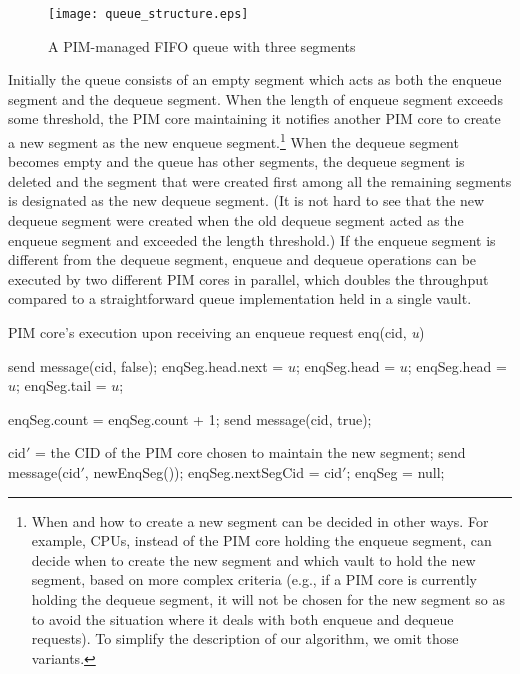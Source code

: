 \begin{figure}[ht!]
\centering
\texttt{[image: queue\_structure.eps]}
\caption{A PIM-managed FIFO queue with three segments}
\label{figure:queue_structure}
\end{figure}

Initially the queue consists of an empty segment which acts as both the enqueue segment and 
the dequeue segment. 
When the length of enqueue segment exceeds some threshold, the PIM core maintaining it
notifies another PIM core to create a new segment as the new enqueue segment.\footnote{
When and how to create a new segment can be decided in other ways.
For example, CPUs, instead of the PIM core holding the enqueue segment, 
can decide when to create the new segment and which vault to hold the new segment, 
based on more complex criteria 
(e.g., if a PIM core is currently holding the dequeue segment, it will not be chosen for 
the new segment so as to avoid the situation where it deals with both enqueue and dequeue requests).
To simplify the description of our algorithm, we omit those variants.}
When the dequeue segment becomes empty and the queue has other segments, 
the dequeue segment is deleted and the segment that were created first 
among all the remaining segments is designated as the new dequeue segment. 
(It is not hard to see that the new dequeue segment were created when the old dequeue segment 
acted as the enqueue segment and exceeded the length threshold.)
If the enqueue segment is different from the dequeue segment, 
enqueue and dequeue operations can be executed by two different PIM cores 
in parallel, which doubles the throughput compared to a straightforward queue implementation 
held in a single vault.  



\begin{algorithm}[ht!]
{\footnotesize
\caption{PIM core's execution upon receiving an enqueue request enq(cid, \textit{u})}
\label{alg:enq}
\begin{algorithmic}[1]
        \State send message(cid, false);
    \Else
            \State enqSeg.head.next = $u$;
            \State enqSeg.head = $u$;
        \Else
            \State enqSeg.head = $u$;
            \State enqSeg.tail = $u$;
        \EndIf

        \State enqSeg.count = enqSeg.count + 1;
        \State send message(cid, true);

            \State cid$'$ = the CID of the PIM core chosen to maintain the new segment;
            \State send message(cid$'$, newEnqSeg());
            \State enqSeg.nextSegCid = cid$'$;
            \State enqSeg = null;
        \EndIf
    \EndIf
\end{algorithmic}
}
\end{algorithm}


